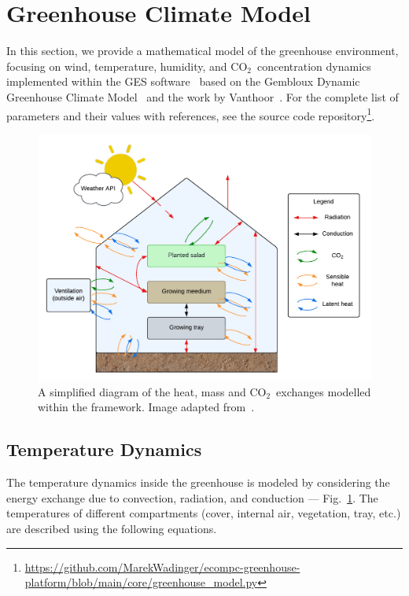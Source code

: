\documentclass[conference]{IEEEtran}
\newcommand{\coo}{\ensuremath{\mathrm{CO_2}}}
\begin{document}
\section{Greenhouse Climate Model}\label{sec:greenhouse}
In this section, we provide a mathematical model of the greenhouse environment, focusing on wind, temperature, humidity, and \coo\ concentration dynamics implemented within the GES software~\cite{rmward61_2019} based on the Gembloux Dynamic Greenhouse Climate Model~\cite{GDGCM} and the work by Vanthoor~\cite{Vanthoor2011}. For the complete list of parameters and their values with references, see the source code repository\footnote{\url{https://github.com/MarekWadinger/ecompc-greenhouse-platform/blob/main/core/greenhouse_model.py}}.

\begin{figure}
    \centering
    \includegraphics[width=\linewidth]{figures/diagram.pdf}
    \caption{A simplified diagram of the heat, mass and \coo\ exchanges modelled within the framework. Image adapted from~\cite{rmward61_2019}.}\label{fig:diagram}
\end{figure}

\subsection{Temperature Dynamics}\label{subsec:temperature}

The temperature dynamics inside the greenhouse is modeled by considering the energy exchange due to convection, radiation, and conduction --- Fig.~\ref{fig:diagram}. The temperatures of different compartments (cover, internal air, vegetation, tray, etc.) are described using the following equations.
\end{document}

